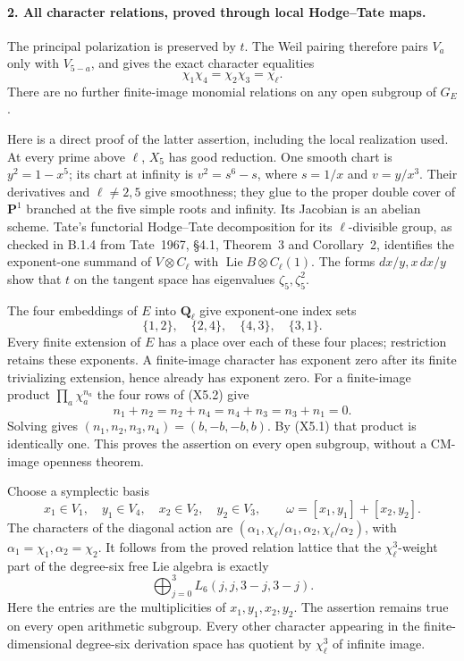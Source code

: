\paragraph{2. All character relations, proved through local Hodge--Tate maps.}
The principal polarization is preserved by $t$. The Weil
pairing therefore pairs $V_a$ only with $V_{5-a}$, and gives
the exact character equalities
\[
 \chi_1\chi_4=\chi_2\chi_3=\chi_\ell.
 \tag{X5.1}
\]
There are no further finite-image monomial relations on any
open subgroup of $G_E$.

Here is a direct proof of the latter assertion, including
the local realization used. At every prime above $\ell$,
$X_5$ has good reduction. One smooth chart is
$y^2=1-x^5$; its chart at infinity is
$v^2=s^6-s$, where $s=1/x$ and $v=y/x^3$.
Their derivatives and $\ell\ne2,5$ give smoothness; they
glue to the proper double cover of $\mathbf P^1$ branched
at the five simple roots and infinity. Its Jacobian is an
abelian scheme. Tate's functorial Hodge--Tate decomposition
for its $\ell$-divisible group, as checked in B.1.4 from
Tate~1967, \S4.1, Theorem~3 and Corollary~2, identifies the
exponent-one summand of $V\otimes C_\ell$ with
$\operatorname{Lie}B\otimes C_\ell(1)$.
The forms $dx/y,x\,dx/y$ show that $t$ on the tangent
space has eigenvalues $\zeta_5,\zeta_5^2$.

The four embeddings of $E$ into $\mathbf Q_\ell$ give
exponent-one index sets
\[
 \{1,2\},\quad \{2,4\},\quad \{4,3\},\quad \{3,1\}.
 \tag{X5.2}
\]
Every finite extension of $E$ has a place over each of these
four places; restriction retains these exponents. A
finite-image character has exponent zero after its finite
trivializing extension, hence already has exponent zero.
For a finite-image product $\prod_a\chi_a^{n_a}$ the four
rows of (X5.2) give
\[
 n_1+n_2=n_2+n_4=n_4+n_3=n_3+n_1=0.
\]
Solving gives
$(n_1,n_2,n_3,n_4)=(b,-b,-b,b)$. By (X5.1) that
product is identically one. This proves the assertion on
every open subgroup, without a CM-image openness theorem.

Choose a symplectic basis
\[
 x_1\in V_1,\quad y_1\in V_4,\quad
 x_2\in V_2,\quad y_2\in V_3,
 \qquad \omega=[x_1,y_1]+[x_2,y_2].
\]
The characters of the diagonal action are
$(\alpha_1,\chi_\ell/\alpha_1,
  \alpha_2,\chi_\ell/\alpha_2)$, with
$\alpha_1=\chi_1,\alpha_2=\chi_2$.
It follows from the proved relation lattice that the
$\chi_\ell^3$-weight part of the degree-six free Lie algebra
is exactly
\[
 \bigoplus_{j=0}^3 L_6(j,j,3-j,3-j).
 \tag{X5.3}
\]
Here the entries are the multiplicities of
$x_1,y_1,x_2,y_2$. The assertion remains true on every open
arithmetic subgroup. Every other character appearing in the
finite-dimensional degree-six derivation space has quotient
by $\chi_\ell^3$ of infinite image.

